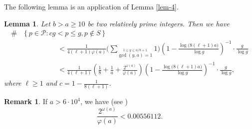 \documentclass[12pt,a4paper,reqno]{amsart}
\numberwithin{equation}{section}
\def\cP{{\mathcal P}}
\theoremstyle{plain}
\newtheorem{lemma}{Lemma}
\theoremstyle{definition}
\newtheorem{remark}{Remark}
\begin{document}
 The following lemma is an application of Lemma \ref{lem-4}.
 \begin{lemma}\label{lem-6}
 	Let $b>a\geq 10$ be two relatively prime integers. Then we have
 	\begin{align*}
 		\#&\left\{p\in\cP:cg< p\leq g, p\notin S \right\}\\
 		&\quad\quad\quad\quad\quad	< \frac{1}{4(\ell+1)\varphi(a)} \Bigg(\sum_{\stackrel{1\leq y\leq a/8+1}{\gcd(y,a)=1} }1\Bigg) \left( 1-\frac{\log \big(8(\ell+1)a \big)}{\log g}\right)^{-1}\cdot \frac{g}{\log g}\\
 		&\quad\quad\quad\quad\quad	<  \frac{1}{4(\ell+1)} \left( \frac{1}{8}+\frac{1}{a}+\frac{2^{\omega(a)}}{\varphi(a)} \right) \left( 1-\frac{\log \big(8(\ell+1)a \big)}{\log g}\right)^{-1}\cdot \frac{g}{\log g},
 	\end{align*}
 	where $\ell\geq 1$ and $c=1-\frac{1}{8(\ell+1)}$.
 \end{lemma}
 \begin{remark}
 	If $a>6\cdot 10^{4}$, we have (see \cite[p.10]{Chen/Zhu})
 	\begin{equation}\label{C1-ineq-1}
 		\frac{2^{\omega(a)}}{\varphi(a)}<0.00556112.
 	\end{equation}
 \end{remark}
\end{document}
